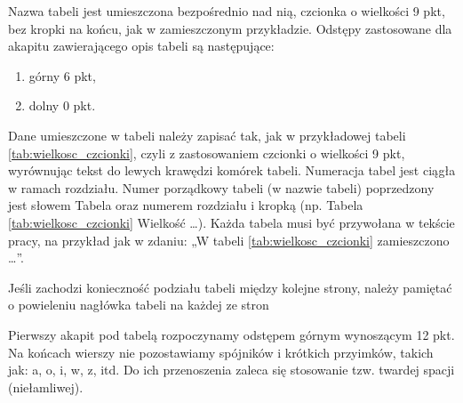 Nazwa tabeli jest umieszczona bezpośrednio nad nią, czcionka o wielkości 9 pkt, bez kropki na końcu, jak w zamieszczonym przykładzie. Odstępy zastosowane dla akapitu zawierającego opis tabeli są następujące:
\begin{enumerate}
\item	górny 6 pkt,
\item	dolny 0 pkt.
\end{enumerate}
Dane umieszczone w tabeli należy zapisać tak, jak w przykładowej tabeli \ref{tab:wielkosc_czcionki}, czyli 
z zastosowaniem czcionki o wielkości 9 pkt, wyrównując tekst do lewych krawędzi komórek tabeli. 
Numeracja tabel jest ciągła w ramach rozdziału. Numer porządkowy tabeli (w nazwie tabeli) poprzedzony jest słowem Tabela oraz numerem rozdziału i kropką (np. Tabela \ref{tab:wielkosc_czcionki} Wielkość …). Każda tabela musi być przywołana w tekście pracy, na przykład jak w zdaniu: „W tabeli \ref{tab:wielkosc_czcionki} zamieszczono …”. 

Jeśli zachodzi konieczność podziału tabeli między kolejne strony, należy pamiętać o powieleniu nagłówka tabeli na każdej ze stron

Pierwszy akapit pod tabelą rozpoczynamy odstępem górnym wynoszącym 12 pkt.
Na końcach wierszy nie pozostawiamy spójników i krótkich przyimków, takich jak: a, o, i, w, z, itd. Do ich przenoszenia zaleca się stosowanie tzw. twardej spacji (niełamliwej).
